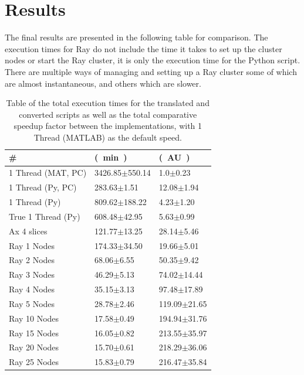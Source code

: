 \documentclass[12pt, a4paper]{article}
\begin{document}
\section{Results}

The final results are presented in the following table for comparison.
The execution times for Ray do not include the time it takes to set up the cluster nodes or start the Ray cluster, it is only the execution time for the Python script.
There are multiple ways of managing and setting up a Ray cluster some of which are almost instantaneous, and others which are slower. 

\begin{table}[H]
    \centering
    \begin{tabular}{|l|l|l|}
    \hline
    \#                 & \unit[Total]{(min)}        & \unit[Speedup]{(AU)}       \\ \hline
    1 Thread (MAT, PC) & 3426.85$\pm$550.14 & 1.0$\pm$0.23     \\ \hline
    1 Thread (Py, PC)  & 283.63$\pm$1.51    & 12.08$\pm$1.94   \\ \hline
    1 Thread (Py)      & 809.62$\pm$188.22  & 4.23$\pm$1.20    \\ \hline
    True 1 Thread (Py) & 608.48$\pm$42.95   & 5.63$\pm$0.99    \\ \hline
    Ax 4 slices        & 121.77$\pm$13.25   & 28.14$\pm$5.46   \\ \hline
    Ray 1 Nodes        & 174.33$\pm$34.50   & 19.66$\pm$5.01   \\ \hline
    Ray 2 Nodes        & 68.06$\pm$6.55     & 50.35$\pm$9.42   \\ \hline
    Ray 3 Nodes        & 46.29$\pm$5.13     & 74.02$\pm$14.44  \\ \hline
    Ray 4 Nodes        & 35.15$\pm$3.13     & 97.48$\pm$17.89  \\ \hline
    Ray 5 Nodes        & 28.78$\pm$2.46     & 119.09$\pm$21.65 \\ \hline
    Ray 10 Nodes       & 17.58$\pm$0.49     & 194.94$\pm$31.76 \\ \hline
    Ray 15 Nodes       & 16.05$\pm$0.82     & 213.55$\pm$35.97 \\ \hline
    Ray 20 Nodes       & 15.70$\pm$0.61     & 218.29$\pm$36.06 \\ \hline
    Ray 25 Nodes       & 15.83$\pm$0.79     & 216.47$\pm$35.84 \\ \hline
    \end{tabular}

    \caption{Table of the total execution times for the translated and converted scripts as well as the total comparative speedup factor between the implementations, with 1 Thread (MATLAB) as the default speed.}
    \label{TotTime}
\end{table}
\end{document}
